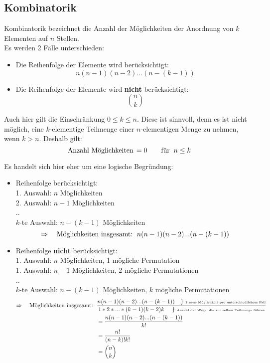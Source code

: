 \documentclass[../MAIN/main.tex]{subfiles}
\begin{document}
\subsection{Kombinatorik}
\begin{Theorem}
  Kombinatorik bezeichnet die Anzahl der Möglichkeiten der Anordnung von $k$ Elementen auf $n$ Stellen.\\
  Es werden 2 Fälle unterschieden:\\
  \begin{itemize}
    \item Die Reihenfolge der Elemente wird berücksichtigt:
          $$n(n-1)(n-2)...(n-(k-1))$$
    \item Die Reihenfolge der Elemente wird \textbf{nicht} berücksichtigt:
          $${n\choose k}$$
  \end{itemize}
\end{Theorem}
\begin{Bemerkung}
  Auch hier gilt die Einschränkung $0 \leq k \leq n$. Diese ist sinnvoll, denn es ist nicht möglich, eine $k$-elementige Teilmenge einer $n$-elementigen Menge zu nehmen, wenn $k > n$. Deshalb gilt:
  $$\text{Anzahl Möglichkeiten\,} = 0 \text{\qquad für \:} n \leq k $$
\end{Bemerkung}
\begin{Beweis}
  Es handelt sich hier eher um eine logische Begründung:\\
  \begin{itemize}
    \item Reihenfolge berücksichtigt:\\
    1. Auswahl: $n$ Möglichkeiten\\
    2. Auswahl: $n-1$ Möglichkeiten\\
    ..\\
    $k$-te Auswahl: $n-(k-1)$ Möglichkeiten\\
    $$\Rightarrow \text{\quad Möglichkeiten insgesamt:\, }  n(n-1)(n-2)...(n-(k-1))$$
    \item Reihenfolge \textbf{nicht} berücksichtigt:\\
    1. Auswahl: $n$ Möglichkeiten, 1 mögliche Permutation\\
    1. Auswahl: $n-1$ Möglichkeiten, 2 mögliche Permutationen\\
    ..\\
    $k$-te Auswahl: $n-(k-1)$ Möglichkeiten, $k$ mögliche Permutationen\\
    \begin{align*}
      \Rightarrow \text{\quad Möglichkeiten insgesamt:\, } & \dfrac{n(n-1)(n-2)...(n-(k-1))\text{\quad \} \tiny{1 neue Möglichkeit pro unterschiedlichem Fall}}}{1*2*...*(k-1)(k-2)k \text{ \quad \} \tiny{Anzahl der Wege, die zur selben Teilmenge führen}}}\\
      & = \dfrac{n(n-1)(n-2)...(n-(k-1))}{k!}\\
      & = \dfrac{n!}{(n-k)!k!}\\
      & = {n\choose k}
    \end{align*}
  \end{itemize}
\end{Beweis}
\end{document}
